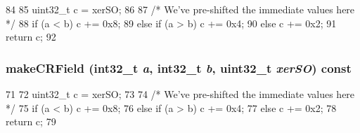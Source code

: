 \begin{DoxyCode}
84     {
85         uint32_t c = xerSO;
86 
87         /* We've pre-shifted the immediate values here */
88         if (a < b)      { c += 0x8; }
89         else if (a > b) { c += 0x4; }
90         else            { c += 0x2; }
91         return c;
92     }
\end{DoxyCode}
\hypertarget{classPowerISA_1_1IntOp_a267e3f812faf502efbbd47f88ee1737a}{
\subsubsection[{makeCRField}]{ makeCRField (int32\_\-t {\em a}, \/  int32\_\-t {\em b}, \/  {\bf uint32\_\-t} {\em xerSO}) const}}
\label{classPowerISA_1_1IntOp_a267e3f812faf502efbbd47f88ee1737a}



\begin{DoxyCode}
71     {
72         uint32_t c = xerSO;
73 
74         /* We've pre-shifted the immediate values here */
75         if (a < b)      { c += 0x8; }
76         else if (a > b) { c += 0x4; }
77         else            { c += 0x2; }
78         return c;
79     }
\end{DoxyCode}


